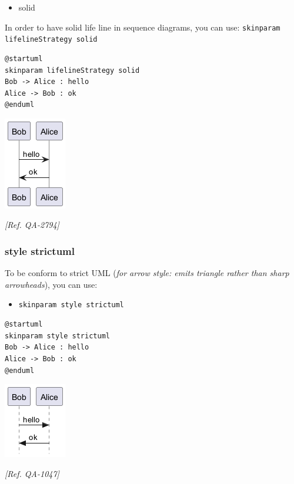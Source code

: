 \begin{itemize}
\item solid
\end{itemize}
In order to have solid life line in sequence diagrams, you can use: \texttt{skinparam lifelineStrategy solid}
\begin{verbatim}
@startuml
skinparam lifelineStrategy solid
Bob -> Alice : hello
Alice -> Bob : ok
@enduml
\end{verbatim}
\begin{center}
\includegraphics[scale=0.60]{imgw/img-0e6c7e64383536bb363507f6f7cf7b8c.png}
\end{center}


\textit{[Ref. QA-2794]}


\subsubsection{style strictuml}
To be conform to strict UML (\textit{for arrow style: emits triangle rather than sharp arrowheads}), you can use:
\begin{itemize}
\item \texttt{skinparam style strictuml}
\end{itemize}
\begin{verbatim}
@startuml
skinparam style strictuml
Bob -> Alice : hello
Alice -> Bob : ok
@enduml
\end{verbatim}
\begin{center}
\includegraphics[scale=0.60]{imgw/img-43c0624948a53d5fd55da6ba4b1d5369.png}
\end{center}
\textit{[Ref. QA-1047]}
%
%
